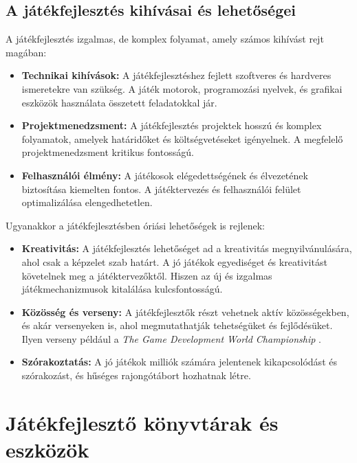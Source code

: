 \subsection{A játékfejlesztés kihívásai és lehetőségei}
 A játékfejlesztés izgalmas, de komplex folyamat, amely számos kihívást rejt magában:
\begin{itemize}
    \item \textbf{Technikai kihívások:} A játékfejlesztéshez fejlett szoftveres és hardveres ismeretekre van szükség. A játék motorok, programozási nyelvek, és grafikai eszközök használata összetett feladatokkal jár.

    
    \item \textbf{Projektmenedzsment:} A játékfejlesztés projektek hosszú és komplex folyamatok, amelyek határidőket és költségvetéseket igényelnek. A megfelelő projektmenedzsment kritikus fontosságú.
    
    \item \textbf{Felhasználói élmény:} A játékosok elégedettségének és élvezetének biztosítása kiemelten fontos. A játéktervezés és felhasználói felület optimalizálása elengedhetetlen.
    
\end{itemize}

Ugyanakkor a játékfejlesztésben óriási lehetőségek is rejlenek:

\begin{itemize}

    \item \textbf{Kreativitás:} A játékfejlesztés lehetőséget ad a kreativitás megnyilvánulására, ahol csak a képzelet szab határt. A jó játékok egyediséget és kreativitást követelnek meg a játéktervezőktől. Hiszen az új és izgalmas játékmechanizmusok kitalálása kulcsfontosságú.
    
    \item \textbf{Közösség és verseny:} A játékfejlesztők részt vehetnek aktív közösségekben, és akár versenyeken is, ahol megmutathatják tehetségüket és fejlődésüket. Ilyen verseny például a \textsl{The Game Development World Championship} \cite{tgdwc}.

    \item \textbf{Szórakoztatás:} A jó játékok milliók számára jelentenek kikapcsolódást és szórakozást, és hűséges rajongótábort hozhatnak létre.
\end{itemize}
\section{Játékfejlesztő könyvtárak és eszközök}

